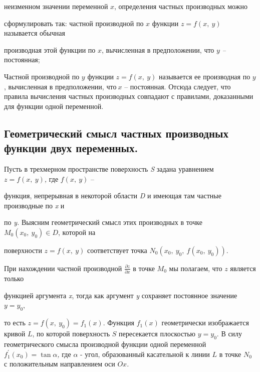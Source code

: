 неизменном значении переменной $x$, определения частных производных
можно

сформулировать так: частной производной по $x$ функции
$z = f(x,\ y)$ называется обычная

производная этой функции по $x$, вычисленная в предположении, что
$y$ \emph{--} постоянная;

Частной производной по $y$ функции $z = f(x,\ y)$ называется ее
производная по $y$, вычисленная в предположении, что$\ x$ --
постоянная. Отсюда следует, что правила вычисления частных производных
совпадают с правилами, доказанными для функции одной переменной.

\hypertarget{ux433ux435ux43eux43cux435ux442ux440ux438ux447ux435ux441ux43aux438ux439-ux441ux43cux44bux441ux43b-ux447ux430ux441ux442ux43dux44bux445-ux43fux440ux43eux438ux437ux432ux43eux434ux43dux44bux445-ux444ux443ux43dux43aux446ux438ux438-ux434ux432ux443ux445-ux43fux435ux440ux435ux43cux435ux43dux43dux44bux445.}{%
\subsection{\texorpdfstring{\textbf{Геометрический смысл частных
производных функции двух
переменных.}}{Геометрический смысл частных производных функции двух переменных.}}\label{ux433ux435ux43eux43cux435ux442ux440ux438ux447ux435ux441ux43aux438ux439-ux441ux43cux44bux441ux43b-ux447ux430ux441ux442ux43dux44bux445-ux43fux440ux43eux438ux437ux432ux43eux434ux43dux44bux445-ux444ux443ux43dux43aux446ux438ux438-ux434ux432ux443ux445-ux43fux435ux440ux435ux43cux435ux43dux43dux44bux445.}}

Пусть в трехмерном пространстве поверхность \emph{S} задана уравнением
$z = f(x,\ y)$\emph{,} где $f(x,\ y)$ --

функция, непрерывная в некоторой области \emph{D} и имеющая там частные
производные по \emph{x} и

по \emph{y.} Выясним геометрический смысл этих производных в точке
$M_{0}(x_{0},\ y_{0}) \in D$, которой на

поверхности $z = f\left( x,\ y \right)$ соответствует точка
$N_{0}(x_{0},\ y_{0},\ f(x_{0},\ y_{0})).$

При нахождении частной производной $\frac{\partial z}{\partial x}$ в
точке $M_{0}$ мы полагаем, что $z$ является только

функцией аргумента \emph{x}, тогда как аргумент \emph{y} сохраняет
постоянное значение $y = y_{0}$,

то есть $z = f(x,\ y_{0}) = f_{1}(x).$ Функция
$f_{1}\left( x \right)$ геометрически изображается кривой $L$, по
которой поверхность $S$ пересекается плоскостью $y = y_{0}$. В силу
геометрического смысла производной функции одной переменной
$f_{1}^{'}(x_{0}) = \tan\alpha$\emph{,} где $\alpha$ - угол,
образованный касательной к линии $L$ в точке $N_{0}\ $ с
положительным направлением оси $Ox$\emph{.}

